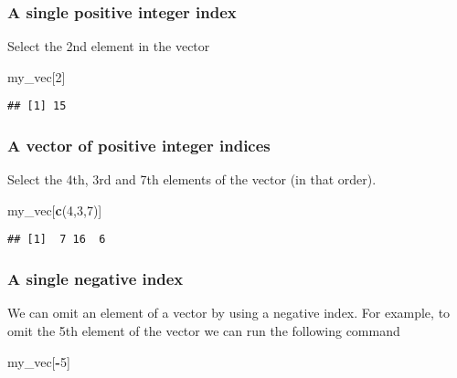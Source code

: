 \documentclass[]{book}
\newenvironment{Shaded}{\begin{snugshade}}{\end{snugshade}}
\newcommand{\DecValTok}[1]{\textcolor[rgb]{0.00,0.00,0.81}{#1}}
\newcommand{\KeywordTok}[1]{\textcolor[rgb]{0.13,0.29,0.53}{\textbf{#1}}}
\newcommand{\NormalTok}[1]{#1}
\newcommand{\OperatorTok}[1]{\textcolor[rgb]{0.81,0.36,0.00}{\textbf{#1}}}
\begin{document}
\hypertarget{posindex}{%
\subsubsection*{A single positive integer index}\label{posindex}}

Select the 2nd element in the vector

\begin{Shaded}
\begin{Highlighting}[]
\NormalTok{my_vec[}\DecValTok{2}\NormalTok{]}
\end{Highlighting}
\end{Shaded}

\begin{verbatim}
## [1] 15
\end{verbatim}

\hypertarget{posvector}{%
\subsubsection*{A vector of positive integer indices}\label{posvector}}

Select the 4th, 3rd and 7th elements of the vector (in that order).

\begin{Shaded}
\begin{Highlighting}[]
\NormalTok{my_vec[}\KeywordTok{c}\NormalTok{(}\DecValTok{4}\NormalTok{,}\DecValTok{3}\NormalTok{,}\DecValTok{7}\NormalTok{)]}
\end{Highlighting}
\end{Shaded}

\begin{verbatim}
## [1]  7 16  6
\end{verbatim}

\hypertarget{negindex}{%
\subsubsection*{A single negative index}\label{negindex}}

We can omit an element of a vector by using a negative index. For example, to omit the 5th element of the vector we can run the following command

\begin{Shaded}
\begin{Highlighting}[]
\NormalTok{my_vec[}\OperatorTok{-}\DecValTok{5}\NormalTok{]}
\end{Highlighting}
\end{Shaded}
\end{document}
